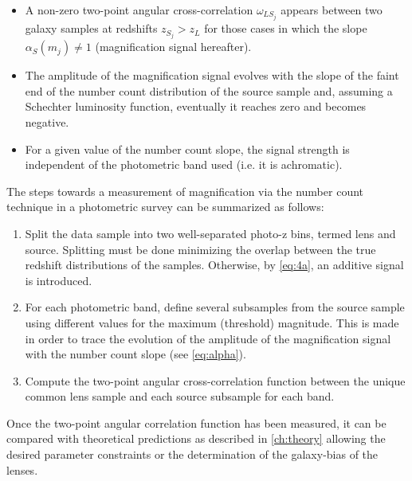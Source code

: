 \begin{itemize}
  \item A non-zero two-point angular cross-correlation $\omega_{LS_j}$ appears between two galaxy samples at redshifts $z_{S_j} > z_L$ for those cases in which the slope $\alpha_S(m_j) \neq 1$ (magnification signal hereafter).
  \item The amplitude of the magnification signal evolves with the slope of the faint end of the number count distribution of the source sample and, assuming a Schechter \cite{1976ApJ...203..297S} luminosity function, eventually it reaches zero and becomes negative.
  \item For a given value of the number count slope, the signal strength is independent of the photometric band used (i.e. it is achromatic).
\end{itemize}

The steps towards a measurement of magnification via the number count technique in a photometric survey can be summarized as follows:
\begin{enumerate}
	\item Split the data sample into two well-separated photo-z bins, termed lens and source.
	Splitting must be done minimizing the overlap between the true redshift distributions of the samples. Otherwise, by \autoref{eq:4a}, an additive signal is introduced.
	\item For each photometric band, define several subsamples from the source sample using different values for the maximum (threshold) magnitude. This is made in order to trace the evolution of the amplitude of the magnification signal with the number count slope (see \autoref{eq:alpha}).
	\item Compute the two-point angular cross-correlation function between the unique common lens sample and each source subsample for each band.
\end{enumerate}
Once the two-point angular correlation function has been measured, it can be compared with theoretical predictions as described in \autoref{ch:theory} allowing the desired parameter constraints or the determination of the galaxy-bias of the lenses.
\newline

